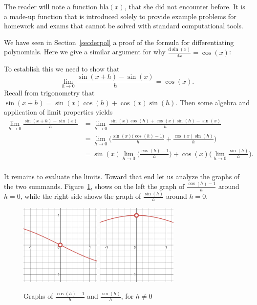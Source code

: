 \begin{note}
The reader will note a function $\mbox{bla}(x)$, that she did not
encounter before. It is a made-up function that is introduced solely to
provide example problems for homework and exams that cannot be solved with standard
computational tools.
\end{note}

\begin{bsp}
We have seen in Section~\ref{secderpol} a proof of the formula for
differentiating polynomials. Here we give a similar argument for why
$\displaystyle\frac{\mbox{d}\sin(x)}{\mbox{d}x}=\cos(x)$:

To establish this we need to show that
\[\lim_{h \to 0}\frac{\sin(x+h)-\sin(x)}{h} = \cos(x).\]
Recall from trigonometry that $\sin(x+h) = \sin(x)\cos(h) + \cos(x)\sin(h)$. Then some algebra and application of limit properties yields
\begin{equation*}
\begin{split}
\lim_{h \to 0}\frac{\sin(x+h)-\sin(x)}{h} &= \lim_{h \to 0} \frac{\sin(x)\cos(h) + \cos(x)\sin(h) - \sin(x)}{h} \\
&= \lim_{h \to 0} \bigg(\frac{\sin(x)\big(\cos(h)-1\big)}{h} + \frac{\cos(x)\sin(h)}{h} \bigg) \\
&= \sin(x) \lim_{h \to 0}\bigg(\frac{\cos(h)-1}{h}\bigg) + \cos(x)\bigg(\lim_{h \to 0}\frac{\sin(h)}{h}\bigg).\\
\end{split}
\end{equation*}

It remains to evaluate the limits. Toward that end let us analyze the graphs
of the two summands. Figure~\ref{tnex1figs}, shows on the left the graph of 
$\frac{\cos(h)-1}{h}$ around $h=0$, while the right side shows the graph of 
$\frac{\sin(h)}{h}$ around $h=0$.

\begin{figure}
\begin{center}
\includegraphics[width=4cm]{pic/tnex1pic1.png}
\qquad
\includegraphics[width=4cm]{pic/tnex1pic2.png}
\end{center}
\caption{Graphs of $\frac{\cos(h)-1}{h}$ and $\frac{\sin(h)}{h}$, for
$h\neq0$}
\label{tnex1figs}
\end{figure}



\end{bsp}
